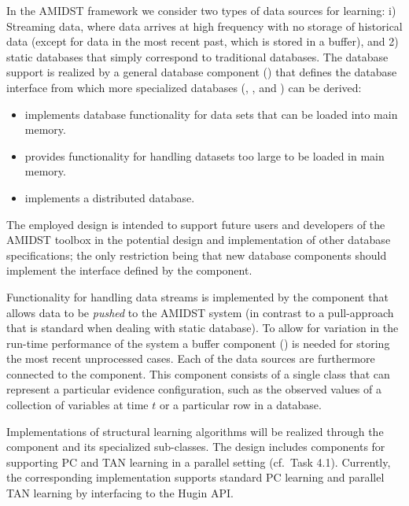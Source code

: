 In the AMIDST framework we consider two types of data sources for learning: i) Streaming data, where data arrives at high
frequency with no storage of historical data (except for data in the most recent past, which is stored in a
buffer), and 2) static databases that simply correspond to traditional databases. The database support is
realized by a general database component () that defines the database interface from which more
specialized databases (, , and ) can be derived:
\begin{itemize}
\item {} implements database functionality for data sets that can be loaded into main memory.
\item {} provides functionality for handling datasets too large to be loaded in main memory.
\item {} implements a distributed database.
\end{itemize}
The employed design is intended to support future users and developers of the AMIDST toolbox in the
potential design
and implementation of other
database specifications; the only restriction being that new database components should implement the interface defined by the
 component. 

Functionality for handling data streams is implemented by the  component that allows data
to be \emph{pushed} to the AMIDST system (in contrast to a pull-approach that is standard when dealing with static
database). To allow for variation in the run-time performance of the system a buffer component
() is needed for storing the most recent unprocessed cases. Each of the data sources are
furthermore connected to the  component. This component consists of a single class
that can represent a particular evidence configuration, such as the observed values of a collection of variables at
time $t$ or a particular row in a database. 

Implementations of structural learning algorithms will be realized through the 
component and its specialized sub-classes. The design includes components for supporting PC and TAN
learning in a parallel setting (cf.\ Task 4.1). Currently, the corresponding implementation supports standard PC
learning and parallel TAN learning by interfacing to the Hugin API. 

